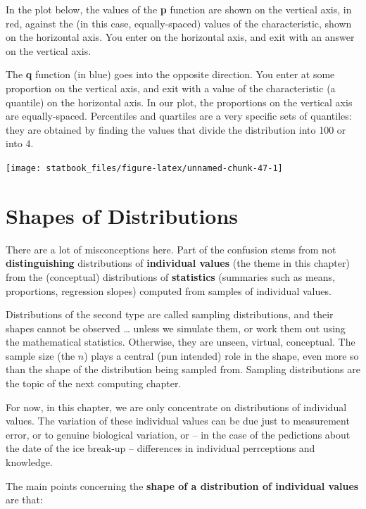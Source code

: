 \documentclass[]{book}
\begin{document}
In the plot below, the values of the \textbf{p} function are shown on the vertical axis, in red, against the (in this case, equally-spaced) values of the characteristic, shown on the horizontal axis. You enter on the horizontal axis, and exit with an answer on the vertical axis.

The \textbf{q} function (in blue) goes into the opposite direction. You enter at some proportion on the vertical axis, and exit with a value of the characteristic (a quantile) on the horizontal axis. In our plot, the proportions on the vertical axis are equally-spaced. Percentiles and quartiles are a very specific sets of quantiles: they are obtained by finding the values that divide the distribution into 100 or into 4.

\begin{center}\texttt{[image: statbook\_files/figure-latex/unnamed-chunk-47-1]} \end{center}

\hypertarget{shapes-of-distributions}{%
\section{Shapes of Distributions}\label{shapes-of-distributions}}

There are a lot of misconceptions here. Part of the confusion stems from not \textbf{distinguishing} distributions of \textbf{individual values} (the theme in this chapter) from the (conceptual) distributions of \textbf{statistics} (summaries such as means, proportions, regression slopes) computed from samples of individual values.

Distributions of the second type are called sampling distributions, and their shapes cannot be observed \ldots{} unless we simulate them, or work them out using the mathematical statistics. Otherwise, they are unseen, virtual, conceptual. The sample size (the \(n\)) plays a central (pun intended) role in the shape, even more so than the shape of the distribution being sampled from. Sampling distributions are the topic of the next computing chapter.

For now, in this chapter, we are only concentrate on distributions of individual values. The variation of these individual values can be due just to measurement error, or to genuine biological variation, or -- in the case of the pedictions about the date of the ice break-up -- differences in individual perrceptions and knowledge.

The main points concerning the \textbf{shape of a distribution of individual values} are that:
\end{document}
